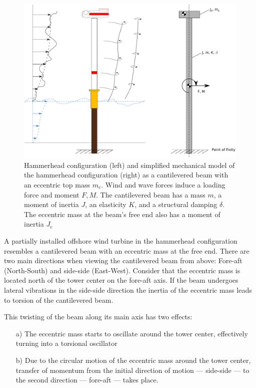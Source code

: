 \documentclass{article}
\begin{document}
\begin{figure}
    \centering
    \includegraphics[width=0.7\linewidth]{figures/loading_3.pdf}
    \caption{Hammerhead configuration (left) and simplified mechanical model of the hammerhead configuration (right) as a cantilevered beam with an eccentric top mass $m_e$. Wind and wave forces induce a loading force and moment $F, M$. The cantilevered beam has a mass $m$, a moment of inertia $J$, an elasticity $K$, and a structural damping $\delta$. The eccentric mass at the beam's free end also has a moment of inertia $J_e$ }
    \label{fig:loading}
\end{figure}

A partially installed offshore wind turbine in the hammerhead configuration resembles a cantilevered beam with an eccentric mass at the free end. There are two main directions when viewing the cantilevered beam from above: Fore-aft (North-South) and side-side (East-West). Consider that the eccentric mass is located north of the tower center on the fore-aft axis. If the beam undergoes lateral vibrations in the side-side direction the inertia of the eccentric mass leads to torsion of the cantilevered beam.

This twisting of the beam along its main axis has two effects: 

\begin{itemize}
    \item[a)] The eccentric mass starts to oscillate around the tower center, effectively turning into a torsional oscillator
    
    \item[b)] Due to the circular motion of the eccentric mass around the tower center, transfer of momentum from the initial direction of motion — side-side — to the second direction — fore-aft — takes place.
\end{itemize}
\end{document}
